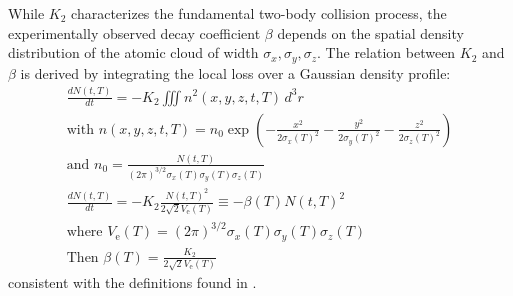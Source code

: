 While $K_2$ characterizes the fundamental two-body collision process, the experimentally observed decay coefficient $\beta$ depends on the spatial density distribution of the atomic cloud of width $\sigma_x, 
\sigma_y, \sigma_z$. The relation between $K_2$ and $\beta$ is derived by integrating the local loss over a Gaussian density profile:
\begin{gather}
\frac{dN(t,T)}{dt} = -K_2 \iiint n^2(x,y,z,t,T) \, d^3r \label{eq:3.24} \\[1.5ex]
\text{with } n(x,y,z,t,T) = n_0 \exp\left( -\frac{x^2}{2\sigma_x(T)^2} - \frac{y^2}{2\sigma_y(T)^2} - \frac{z^2}{2\sigma_z(T)^2} \right) \label{eq:3.25} \\[1.5ex]
\text{and } n_0 = \frac{N(t,T)}{(2\pi)^{3/2}\sigma_x(T)\sigma_y(T)\sigma_z(T)} \label{eq:3.25bis} \\[1.5ex]
\frac{dN(t,T)}{dt} = -K_2 \frac{N(t,T)^2}{2\sqrt{2}V_{\text{e}}(T)} \equiv -\beta(T) N(t,T)^2 \label{eq:3.26} \\[1.5ex]
\text{where } V_{\text{e}}(T) = (2\pi)^{3/2} \sigma_x(T) \sigma_y(T) \sigma_z(T) \label{eq:3.27} \\[1.5ex]
\text{Then } \beta(T) = \frac{K_2}{2\sqrt{2}V_{\text{e}}(T)} \label{eq:3.28}
\end{gather}
consistent with the definitions found in \cite{han_photoassociation_2018}.

